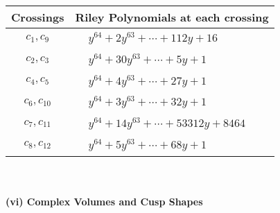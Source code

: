 \documentclass[1p]{elsarticle_modified}
\theoremstyle{definition}
\begin{document}
\begin{tabular}{m{50pt}|m{274pt}}
Crossings & \hspace{64pt}Riley Polynomials at each crossing \\
\hline $$\begin{aligned}c_{1},c_{9}\end{aligned}$$&$\begin{aligned}
&y^{64}+2 y^{63}+\cdots+112 y+16
\end{aligned}$\\
\hline $$\begin{aligned}c_{2},c_{3}\end{aligned}$$&$\begin{aligned}
&y^{64}+30 y^{63}+\cdots+5 y+1
\end{aligned}$\\
\hline $$\begin{aligned}c_{4},c_{5}\end{aligned}$$&$\begin{aligned}
&y^{64}+4 y^{63}+\cdots+27 y+1
\end{aligned}$\\
\hline $$\begin{aligned}c_{6},c_{10}\end{aligned}$$&$\begin{aligned}
&y^{64}+3 y^{63}+\cdots+32 y+1
\end{aligned}$\\
\hline $$\begin{aligned}c_{7},c_{11}\end{aligned}$$&$\begin{aligned}
&y^{64}+14 y^{63}+\cdots+53312 y+8464
\end{aligned}$\\
\hline $$\begin{aligned}c_{8},c_{12}\end{aligned}$$&$\begin{aligned}
&y^{64}+5 y^{63}+\cdots+68 y+1
\end{aligned}$\\
\hline
\end{tabular}\\~\\
\newpage\flushleft \textbf{(vi) Complex Volumes and Cusp Shapes}
\end{document}
